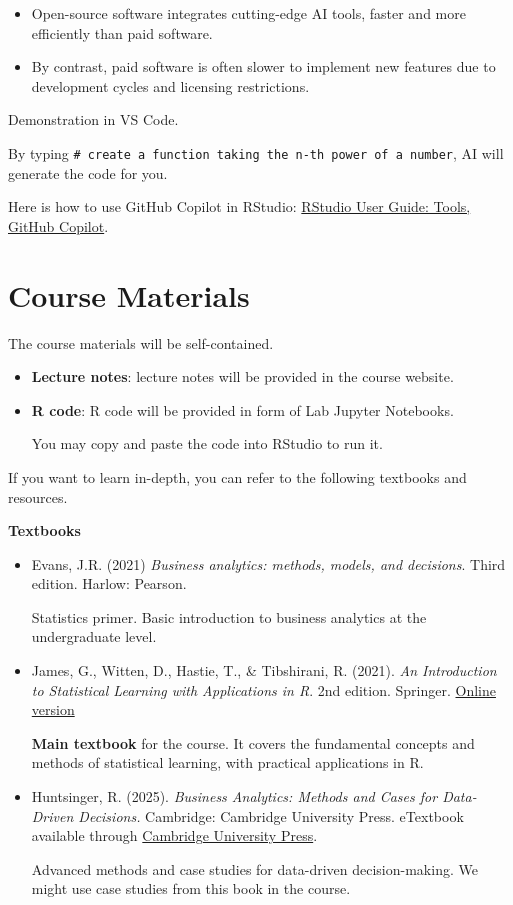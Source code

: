 \documentclass[
  12pt,
  letterpaper,
]{scrbook}
\providecommand{\tightlist}{%
  \setlength{\itemsep}{0pt}\setlength{\parskip}{0pt}}
\renewcommand{\tightlist}{\setlength{\itemsep}{0.5\baselineskip}\setlength{\parskip}{0.2\baselineskip}}
\theoremstyle{definition}
\theoremstyle{plain}
\theoremstyle{remark}
\begin{document}
\begin{itemize}
\tightlist
\item
  Open-source software integrates cutting-edge AI tools, faster and more
  efficiently than paid software.
\item
  By contrast, paid software is often slower to implement new features
  due to development cycles and licensing restrictions.
\end{itemize}

{ Demonstration in VS Code. }

By typing
\texttt{\#\ create\ a\ function\ taking\ the\ n-th\ power\ of\ a\ number},
AI will generate the code for you.

Here is how to use GitHub Copilot in RStudio:
\href{https://docs.posit.co/ide/user/ide/guide/tools/copilot.html\#using-copilot}{RStudio
User Guide: Tools, GitHub Copilot}.

\section{Course Materials}\label{course-materials}

The course materials will be self-contained.

\begin{itemize}
\item
  \textbf{Lecture notes}: lecture notes will be provided in the course
  website.
\item
  \textbf{R code}: R code will be provided in form of Lab Jupyter
  Notebooks.

  You may copy and paste the code into RStudio to run it.
\end{itemize}

If you want to learn in-depth, you can refer to the following textbooks
and resources.

\textbf{Textbooks}

\begin{itemize}
\item
  Evans, J.R. (2021) \emph{Business analytics: methods, models, and
  decisions}. Third edition. Harlow: Pearson.

  Statistics primer. Basic introduction to business analytics at the
  undergraduate level.
\item
  James, G., Witten, D., Hastie, T., \& Tibshirani, R. (2021). \emph{An
  Introduction to Statistical Learning with Applications in R}. 2nd
  edition. Springer. \href{https://www.statlearning.com/}{Online
  version}

  \textbf{Main textbook} for the course. It covers the fundamental
  concepts and methods of statistical learning, with practical
  applications in R.
\item
  Huntsinger, R. (2025). \emph{Business Analytics: Methods and Cases for
  Data-Driven Decisions.} Cambridge: Cambridge University Press.
  eTextbook available through
  \href{https://www.cambridge.org/highereducation/books/business-analytics/49F97FC7360294F70056ADDC895C61AE\#overview}{Cambridge
  University Press}.

  Advanced methods and case studies for data-driven decision-making. We
  might use case studies from this book in the course.
\end{itemize}
\end{document}
